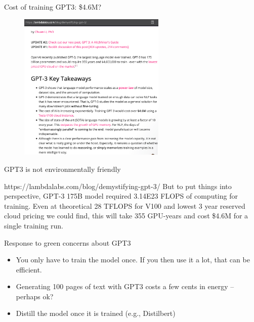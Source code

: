 \begin{frame}{Cost of training GPT3: \$4.6M?}

\vfill

	\begin{figure}
		\centering
		\includegraphics[width=7cm]{figure/gpt3cost.png}
	\end{figure}

\vfill

\end{frame}



\begin{vbframe}{GPT3 is not environmentally friendly}

\vfill

  \begin{block}{https://lambdalabs.com/blog/demystifying-gpt-3/}
      But to put things into perspective, GPT-3 175B model
      required 3.14E23 FLOPS of computing for training. Even
      at theoretical 28 TFLOPS for V100 and lowest 3 year
      reserved cloud pricing we could find, this will take
      355 GPU-years and cost \$4.6M for a single training
      run.
  \end{block}

\vfill

\end{vbframe}



\begin{vbframe}{Response to green concerns about GPT3}

\vfill

  \begin{itemize}
\item You only have to train the model once. If you
then use it a lot, that can be efficient.
\item Generating 100 pages of text with GPT3 costs a
few cents in energy -- perhaps ok?
\item Distill the model once it is trained (e.g., Distilbert)
    \end{itemize}
    
\vfill

\end{vbframe}

